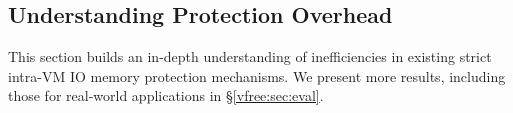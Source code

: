 \subsection{Understanding Protection Overhead}
\label{vfree:sec:inefficiencies}
This section builds an in-depth understanding of inefficiencies in existing strict intra-VM IO memory protection mechanisms. We present more results, including those for real-world applications 
  in \S\ref{vfree:sec:eval}.



